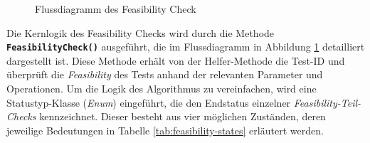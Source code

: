 \begin{figure}[!htbp]
    \centering
    \caption{Flussdiagramm des Feasibility Check}
    \label{fig:feasibility-check}
\end{figure}

Die Kernlogik des Feasibility Checks wird durch die Methode \textbf{\texttt{FeasibilityCheck()}} ausgeführt, die im Flussdiagramm in Abbildung \ref{fig:feasibility-check} detailliert dargestellt ist. Diese Methode erhält von der Helfer-Methode die Test-ID und überprüft die \textit{Feasibility} des Tests anhand der relevanten Parameter und Operationen. Um die Logik des Algorithmus zu vereinfachen, wird eine Statustyp-Klasse (\textit{Enum}) eingeführt, die den Endstatus einzelner \textit{Feasibility-Teil-Checks} kennzeichnet. Dieser besteht aus vier möglichen Zuständen, deren jeweilige Bedeutungen in Tabelle \ref{tab:feasibility-states} erläutert werden.


